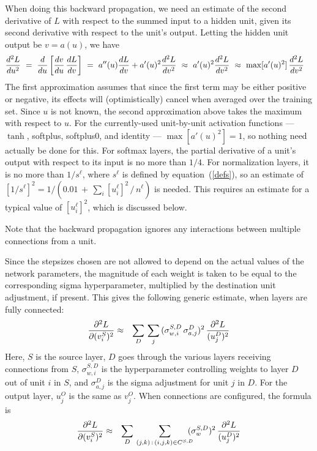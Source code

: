 \documentclass{report}[11pt]
\def\beq{\begin{eqnarray}}
\def\eeq{\end{eqnarray}}
\def\eep{\end{eqnarray}}
\begin{document}
When doing this backward propagation, we need an estimate of the
second derivative of $L$ with respect to the summed input to a
hidden unit, given its second derivative with respect to the unit's
output.  Letting the hidden unit output be $v = a(u)$, we have\beq
  {d^2L \over du^2}
   \ = \ {d \over du} \left[ {dv \over du}\, {dL \over dv} \right] 
   \ = \ a''(u) {dL \over dv} + a'(u)^2 {d^2L \over dv^2}
   \ \approx \ a'(u)^2 {d^2L \over dv^2} 
   \ \approx \ \max[a'(u)^2]\, {d^2L \over dv^2}\ \ \
\eeq%
The first approximation assumes that since the first term may be
either positive or negative, its effects will (optimistically) cancel
when averaged over the training set.  Since $u$ is not known, the
second approximation above takes the maximum with respect to $u$.  For
the currently-used unit-by-unit activation functions --- $\tanh$,
softplus, softplus0, and identity --- $\max[a'(u)^2] = 1$, so nothing
need actually be done for this.  For softmax layers, the partial
derivative of a unit's output with respect to its input is no more
than $1/4$.  For normalization layers, it is no more than $1/s^{\ell}$,
where $s^{\ell}$ is defined by equation~(\ref{defs}), so an estimate of
$[1/s^{\ell}]^2 = 1/(0.01\,+\,\sum\nolimits_i [u^{\ell}_i]^2\,/\,n^{\ell})$ 
is needed.  This requires an estimate for a typical value of
$[u^{\ell}_i]^2$, which is discussed below.

Note that the backward propagation ignores any interactions between
multiple connections from a unit.

Since the stepsizes chosen are not allowed to depend on the actual
values of the network parameters, the magnitude of each weight is
taken to be equal to the corresponding sigma hyperparameter,
multiplied by the destination unit adjustment, if present.  This gives
the following generic estimate, when layers are fully connected:\beq
  {\partial^2 L \over \partial (v^S_i)^2} & \approx &
     \sum_D\, \sum_j\, (\sigma^{S,D}_{w,i}\, \sigma^D_{a,j})^2\, 
     {\partial^2 L \over (u^D_j)^2}
\eeq%
Here, $S$ is the source layer, $D$ goes through the various layers
receiving connections from $S$, $\sigma^{S,D}_{w,i}$ is the
hyperparameter controlling weights to layer $D$ out of unit $i$ in
$S$, and $\sigma^D_{a,j}$ is the sigma adjustment for unit $j$ in $D$.
For the output layer, $u^O_j$ is the same as $v^O_j$.
When connections are configured, the formula is
\beq
  {\partial^2 L \over \partial (v^S_i)^2} & \approx &
     \sum_D\, \sum_{(j,k)\,:\,(i,j,k)\in C^{S,D}}\!\!\!\!
       (\sigma^{S,D}_w)^2\, {\partial^2 L \over (u^D_j)^2}
\eep
     
\end{document}
